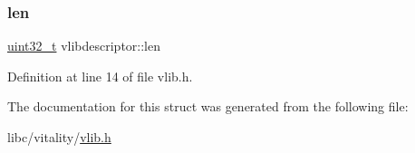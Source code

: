 \subsubsection{\texorpdfstring{len}{len}}
{\footnotesize\ttfamily \hyperlink{a00116_a435d1572bf3f880d55459d9805097f62_a435d1572bf3f880d55459d9805097f62}{uint32\+\_\+t} vlibdescriptor\+::len}



Definition at line 14 of file vlib.\+h.



The documentation for this struct was generated from the following file\+:\begin{DoxyCompactItemize}
\item 
libc/vitality/\hyperlink{a00158}{vlib.\+h}\end{DoxyCompactItemize}

